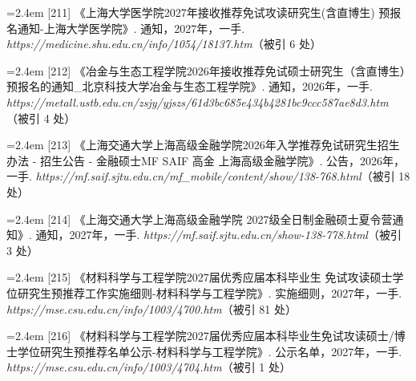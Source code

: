 {\vspace{0.6pt}
\noindent\hangindent=2.4em \label{src:S0269}{\color{cAccent}[211]} 《上海大学医学院2027年接收推荐免试攻读研究生(含直博生) 预报名通知-上海大学医学院》. 通知，2027年，一手. \textit{https://medicine.shu.edu.cn/info/1054/18137.htm}（被引 6 处）\par
\vspace{0.6pt}
\vspace{3.5pt}\par
\nopagebreak\vspace{1pt}
\noindent\hangindent=2.4em \label{src:S0270}{\color{cAccent}[212]} 《冶金与生态工程学院2026年接收推荐免试硕士研究生（含直博生）预报名的通知\_北京科技大学冶金与生态工程学院》. 通知，2026年，一手. \textit{https://metall.ustb.edu.cn/zsjy/yjszs/61d3bc685e434b4281bc9ccc587ae8d3.htm}（被引 4 处）\par
\vspace{0.6pt}
\vspace{3.5pt}\par
\nopagebreak\vspace{1pt}
\noindent\hangindent=2.4em \label{src:S0271}{\color{cAccent}[213]} 《上海交通大学上海高级金融学院2026年入学推荐免试研究生招生办法 - 招生公告 - 金融硕士MF \textbar{} SAIF \textbar{} 高金 \textbar{} 上海高级金融学院》. 公告，2026年，一手. \textit{https://mf.saif.sjtu.edu.cn/mf\_mobile/content/show/138-768.html}（被引 18 处）\par
\vspace{0.6pt}
\noindent\hangindent=2.4em \label{src:S0272}{\color{cAccent}[214]} 《上海交通大学上海高级金融学院 2027级全日制金融硕士夏令营通知》. 通知，2027年，一手. \textit{https://mf.saif.sjtu.edu.cn/show-138-778.html}（被引 3 处）\par
\vspace{0.6pt}
\vspace{3.5pt}\par
\nopagebreak\vspace{1pt}
\noindent\hangindent=2.4em \label{src:S0273}{\color{cAccent}[215]} 《材料科学与工程学院2027届优秀应届本科毕业生 免试攻读硕士学位研究生预推荐工作实施细则-材料科学与工程学院》. 实施细则，2027年，一手. \textit{https://mse.csu.edu.cn/info/1003/4700.htm}（被引 81 处）\par
\vspace{0.6pt}
\noindent\hangindent=2.4em \label{src:S0274}{\color{cAccent}[216]} 《材料科学与工程学院2027届优秀应届本科毕业生免试攻读硕士/博士学位研究生预推荐名单公示-材料科学与工程学院》. 公示名单，2027年，一手. \textit{https://mse.csu.edu.cn/info/1003/4704.htm}（被引 1 处）\par
}
